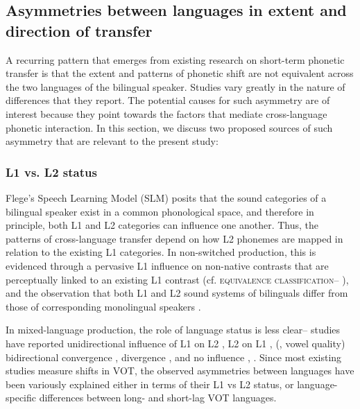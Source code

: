 \documentclass[12 pt]{article}
\begin{document}
\subsection{Asymmetries between languages in extent and direction of transfer} \label{asymmetries}
A recurring pattern that emerges from existing research on short-term phonetic transfer is that the extent and patterns of phonetic shift are not equivalent across the two languages of the bilingual speaker. Studies vary greatly in the nature of differences that they report. The potential causes for such asymmetry are of interest because they point towards the factors that mediate cross-language phonetic interaction. In this section, we discuss two proposed sources of such asymmetry that are relevant to the present study: 

\subsubsection*{L1 vs. L2 status} 
Flege's Speech Learning Model (SLM) \citeyearpar{flege1995second,flege2007language} posits that the sound categories of a bilingual speaker exist in a common phonological space, and therefore in principle, both L1 and L2 categories can influence one another. Thus, the patterns of cross-language transfer depend on how L2 phonemes are mapped in relation to the existing L1 categories. In non-switched production, this is evidenced through a pervasive L1 influence on non-native contrasts that are perceptually linked to an existing L1 contrast (cf. \textsc{equivalence classification}-- \cite{flege1984limits,flege1987production}), and the observation that both L1 and L2 sound systems of bilinguals differ from those of corresponding monolingual speakers \citep[e.g.][vowel quality]{guion2003vowel}. 

In mixed-language production, the role of language status is less clear-- studies have reported unidirectional influence of L1 on L2 \citep[][VOT]{balukas2015spanish,antoniou2011inter,vsimavckova2015immediate,goldrick2014language}, L2 on L1 \citep[][VOT]{tsui2019impact, olson2013bilingual}, (\cite{elias2017effects}, vowel quality) bidirectional convergence \citep[][VOT]{bullock2009trying, olson2016role}, divergence \citep[][VOT]{bullock2009trying,vsimavckova2018patterns}, and no influence \citep[][vowel quality]{muldner2019phonetics}, \citep[][phonological process]{schwartz2015language}. Since most existing studies measure shifts in VOT, the observed asymmetries between languages have been variously explained either in terms of their L1 vs L2 status, or language-specific differences between long- and short-lag VOT languages. %
\end{document}
